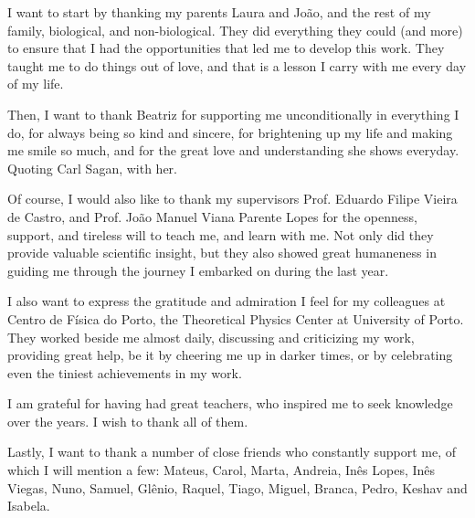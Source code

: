 
\begin{acknowledgments} 

I want to start by thanking my parents Laura and João, and the rest of my family, biological, and non-biological.
They did everything they could (and more) to ensure that I had the opportunities that led me to develop this work.
They taught me to do things out of love, and that is a lesson I carry with me every day of my life.

Then, I want to thank Beatriz for supporting me unconditionally in everything I do, for always being  so kind and sincere, for brightening up my life and making me smile so much, and for the great love and understanding she shows everyday.
Quoting Carl Sagan,  with her.

Of course, I would also like to thank my supervisors Prof. Eduardo Filipe Vieira de Castro, and Prof. João Manuel Viana Parente Lopes for the openness, support, and tireless will to teach me, and learn with me.
Not only did they provide valuable scientific insight, but they also showed great humaneness in guiding me through the journey I embarked on during the last year.

I also want to express the gratitude and admiration I feel for my colleagues at Centro de Física do Porto, the Theoretical Physics Center at University of Porto.
They worked beside me almost daily, discussing and criticizing my work, providing great help, be it by cheering me up in darker times, or by celebrating even the tiniest achievements in my work.

I am grateful for having had great teachers, who inspired me to seek knowledge over the years. I wish to thank all of them. %

Lastly, I want to thank a number of close friends who constantly support me, of which I will mention a few: Mateus, Carol, Marta, Andreia, Inês Lopes, Inês Viegas, Nuno, Samuel, Glênio, Raquel, Tiago, Miguel, Branca, Pedro, Keshav and Isabela. 

\end{acknowledgments}
\clearpage
\thispagestyle{empty}
\cleardoublepage